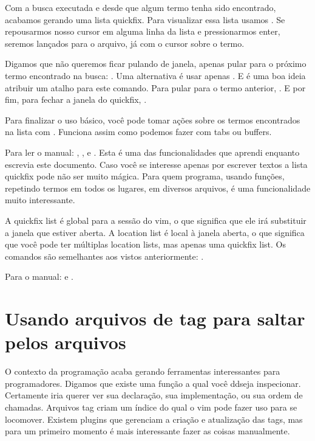 
Com a busca executada e desde que algum termo tenha sido encontrado, acabamos gerando uma lista quickfix.
Para visualizar essa lista usamos .
Se repousarmos nosso cursor em alguma linha da lista e pressionarmos enter,
seremos lançados para o arquivo, já com o cursor sobre o termo.


Digamos que não queremos ficar pulando de janela, apenas pular para o próximo termo encontrado na busca: .
Uma alternativa é usar apenas . 
E é uma boa ideia atribuir um atalho para este comando.
Para pular para o termo anterior, .
E por fim, para fechar a janela do quickfix, .

Para finalizar o uso básico, você pode tomar ações sobre os termos encontrados na lista com .
Funciona assim como podemos fazer com tabs ou buffers.

Para ler o manual: , ,  e .
Esta é uma das funcionalidades que aprendi enquanto escrevia este documento.
Caso você se interesse apenas por escrever textos a lista quickfix pode não ser muito mágica.
Para quem programa, usando funções, repetindo termos em todos os lugares, em diversos arquivos,
é uma funcionalidade muito interessante.

A quickfix list é global para a sessão do vim, o que significa que ele irá substituir a janela que estiver aberta.
A location list é local à janela aberta, o que significa que você pode ter múltiplas location lists, mas apenas uma quickfix list.
Os comandos são semelhantes aos vistos anteriormente:    .

Para o manual:   e .

\section{Usando arquivos de tag para saltar pelos arquivos}
O contexto da programação acaba gerando ferramentas interessantes para programadores.
Digamos que existe uma função a qual você ddseja inspecionar.
Certamente iria querer ver sua declaração, sua implementação, ou sua ordem de chamadas.
Arquivos tag criam um índice do qual o vim pode fazer uso para se locomover.
Existem plugins que gerenciam a criação e atualização das tags,
mas para um primeiro momento é mais interessante fazer as coisas manualmente.

